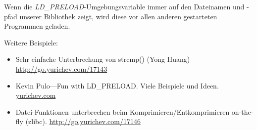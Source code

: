 Wenn die \emph{LD\_PRELOAD}-Umgebungsvariable immer auf den Dateinamen und -pfad unserer
Bibliothek zeigt, wird diese vor allen anderen gestarteten Programmen geladen.

Weitere Beispiele:

\begin{itemize}

\item
Sehr einfache Unterbrechung von strcmp() (Yong Huang)
\url{http://go.yurichev.com/17143}

\item
Kevin Pulo---Fun with LD\_PRELOAD. Viele Beispiele und Ideen.
\href{http://go.yurichev.com/17145}{yurichev.com}

\item
Datei-Funktionen unterbrechen beim Komprimieren/Entkomprimieren on-the-fly (zlibc). \url{http://go.yurichev.com/17146}
\end{itemize}
